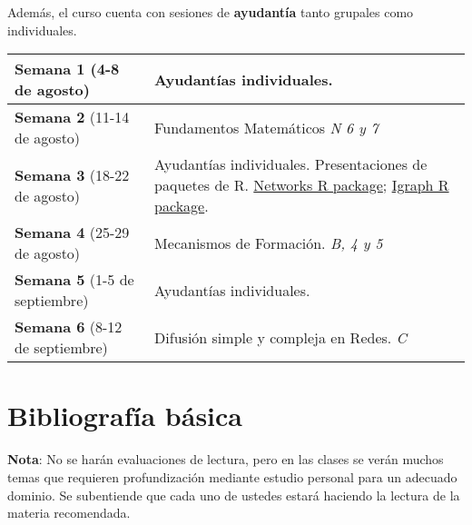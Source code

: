 \documentclass[12pt]{article}
\begin{document}
\newpage

Además, el curso cuenta con sesiones de \textbf{ayudantía} tanto grupales como individuales.

\vspace{0.5cm}

\begin{longtable}{|p{4cm}|p{11cm}|}
\hline
\textbf{Semana 1} \newline (4-8 de agosto) & 
Ayudantías individuales. \\
\hline
\textbf{Semana 2} \newline (11-14 de agosto) &
Fundamentos Matemáticos
\newline \newline 
\textit{N 6 y 7} \\
\hline
\textbf{Semana 3} \newline (18-22 de agosto) &
Ayudantías individuales. Presentaciones de paquetes de R. 
\newline \newline 
\href{https://cran.r-project.org/web/packages/network/index.html}{Networks R package}; \href{https://cran.r-project.org/web/packages/igraph/index.html}{Igraph R package}. \\
\hline
\textbf{Semana 4} \newline (25-29 de agosto) &
Mecanismos de Formación.
\newline \newline 
\textit{B, 4 y 5} \\
\hline
\textbf{Semana 5} \newline (1-5 de septiembre) &
Ayudantías individuales. \\
\hline
\textbf{Semana 6} \newline (8-12 de septiembre) &
Difusión simple y compleja en Redes.
\newline \newline 
\textit{C} \\
\hline
\end{longtable}

\newpage
\section{Bibliografía básica}

\textbf{Nota}: No se harán evaluaciones de lectura, pero en las clases se verán muchos temas que requieren profundización mediante estudio personal para un adecuado dominio. Se subentiende que cada uno de ustedes estará haciendo la lectura de la materia recomendada.
\end{document}

